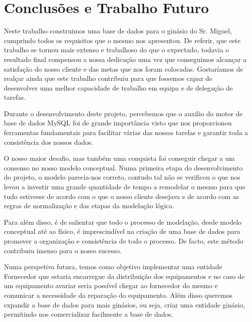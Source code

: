 \chapter{Conclusões e Trabalho Futuro}

Neste trabalho construimos uma  base de dados para o ginásio do Sr. Miguel, cumprindo todos os requisitos que o mesmo nos  apresentou. De referir, que este trabalho se tornou mais extenso e trabalhoso do que o expectado, todavia o resultado final compensou a nossa dedicação uma vez que conseguimos alcançar a satisfação do nosso cliente e das metas que nos foram  colocadas. Gostaríamos de realçar ainda que este trabalho contribuiu para que fossemos capaz de desenvolver uma melhor capacidade de trabalho em equipa e de delegação de tarefas.  \par
Durante o desenvolvimento deste projeto, percebemos que o auxilio do motor de base de dados MySQL foi de grande importância visto que nos proporcionou ferramentas fundamentais para facilitar várias das nossas tarefas e garantir toda a consistência dos nossos dados.

\par O nosso maior desafio, mas também uma conquista foi conseguir chegar a um consenso no nosso modelo conceptual. Numa primeira etapa do desenvolvimento do projeto, o modelo parecia-nos correto, contudo tal não se verificou o que nos levou a investir uma grande quantidade de tempo a remodelar o mesmo para que tudo estivesse de acordo com o que o nosso cliente desejava e de acordo com as regras de normalização e das etapas da modelação lógica.\par
Para além disso, é de salientar que todo o processo de modelação, desde modelo conceptual até ao físico, é imprescindível na criação de uma base de dados para promover a organização e consistência de todo o processo. De facto, este método contribuiu imenso para o nosso sucesso.
\par Numa perspetiva futura, temos como objetivo implementar uma entidade Fornecedor que estaria encarregue da distribuição dos equipamentos e no caso de um equipamento avariar seria possível chegar ao fornecedor do mesmo e comunicar a necessidade da reparação do equipamento. Além disso queremos expandir a base de dados para mais ginásios, ou seja, criar uma entidade ginásio, permitindo nos comercializar facilmente a base de dados.
